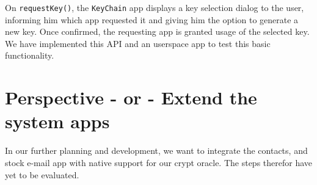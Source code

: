 \documentclass[a4paper,draft]{scrartcl}
\begin{document}
	On \texttt{requestKey()}, the \texttt{KeyChain} app displays a key selection dialog to the user, informing him which app requested it and giving him the option to generate a new key. Once confirmed, the requesting app is granted usage of the selected key.\\
	We have implemented this API and an userspace app to test this basic functionality.

\section{Perspective - or - Extend the system apps}
In our further planning and development, we want to integrate the contacts, and stock e-mail app with native support for our crypt oracle. The steps therefor have yet to be evaluated.
\end{document}
